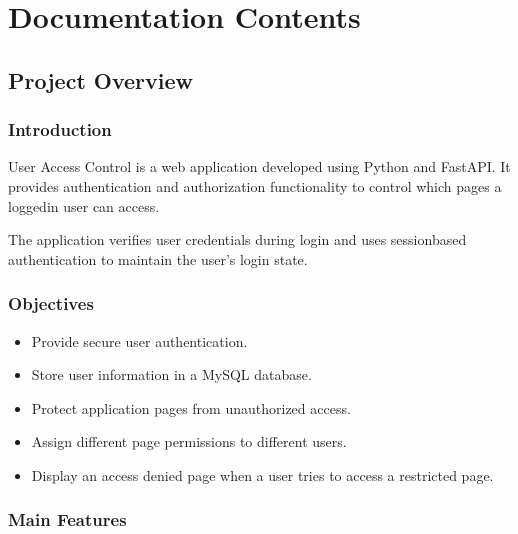 \documentclass[letterpaper,10pt,english]{sphinxmanual}
\begin{document}
\chapter{Documentation Contents}
\label{\detokenize{index:documentation-contents}}
\sphinxstepscope


\section{Project Overview}
\label{\detokenize{overview:project-overview}}\label{\detokenize{overview::doc}}

\subsection{Introduction}
\label{\detokenize{overview:introduction}}
\sphinxAtStartPar
User Access Control is a web application developed using Python and FastAPI.
It provides authentication and authorization functionality to control which
pages a logged\sphinxhyphen{}in user can access.

\sphinxAtStartPar
The application verifies user credentials during login and uses session\sphinxhyphen{}based
authentication to maintain the user’s login state.


\subsection{Objectives}
\label{\detokenize{overview:objectives}}\begin{itemize}
\item {} 
\sphinxAtStartPar
Provide secure user authentication.

\item {} 
\sphinxAtStartPar
Store user information in a MySQL database.

\item {} 
\sphinxAtStartPar
Protect application pages from unauthorized access.

\item {} 
\sphinxAtStartPar
Assign different page permissions to different users.

\item {} 
\sphinxAtStartPar
Display an access denied page when a user tries to access a restricted page.

\end{itemize}


\subsection{Main Features}
\label{\detokenize{overview:main-features}}
\end{document}

